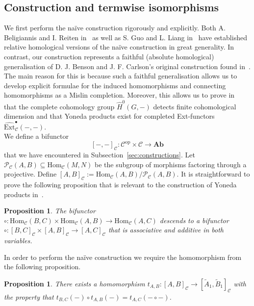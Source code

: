 \documentclass[12pt,a4paper]{article}
\numberwithin{equation}{section}
\newtheorem{prop}[thm]{Proposition}
\theoremstyle{nonumberplain}
\begin{document}
\subsection{Construction and termwise isomorphisms}

We first perform the naïve construction rigorously and explicitly. Both A.\! Beligiannis and I.\! Reiten in~\cite[p.~37--38/163--165]{bel07} as well as S.\! Guo and L.\! Liang in~\cite[p.~14--15]{guo23} have established relative homological versions of the naïve construction in great generality. In contrast, our construction represents a faithful (absolute homological) generalisation of D.\! J.\! Benson and J.\! F.\! Carlson's original construction found in~\cite[p.~109]{ben92}. The main reason for this is because such a faithful generalisation allows us to develop explicit formulae for the induced homomorphisms and connecting homomorphisms as a Mislin completion. Moreover, this allows us to prove in~\cite{ghe24} that the complete cohomology group $\widehat{H}^0(G, -)$ detects finite cohomological dimension and that Yoneda products exist for completed Ext-functors $\widehat{\mathrm{Ext}}_{\mathcal{C}}^{\bullet}(-, -)$. \\

We define a bifunctor
\[ [-, -]_{\mathcal{C}}: \mathcal{C}^{\mathrm{op}} \times \mathcal{C} \rightarrow \mathbf{Ab} \]
that we have encountered in Subsection~\ref{sec:constructions}. Let $\mathcal{P}_{\mathcal{C}}(A, B) \subseteq \mathrm{Hom}_{\mathcal{C}}(M, N)$ be the subgroup of morphisms factoring through a projective. Define $[A, B]_{\mathcal{C}} := \mathrm{Hom}_{\mathcal{C}}(A, B) / \mathcal{P}_{\mathcal{C}}(A, B)$. It is straightforward to prove the following proposition that is relevant to the construction of Yoneda products in~\cite[Theorem~6.6]{ghe24}.

\begin{prop}\label{prop:biadditive}
The bifunctor $\circ: \mathrm{Hom}_{\mathcal{C}}(B, C) \times \mathrm{Hom}_{\mathcal{C}}(A, B) \rightarrow \mathrm{Hom}_{\mathcal{C}}(A, C)$ descends to a bifunctor $\circ: [B, C]_{\mathcal{C}} \times [A, B]_{\mathcal{C}} \rightarrow [A, C]_{\mathcal{C}}$ that is associative and additive in both variables.
\end{prop}

In order to perform the naïve construction we require the homomorphism from the following proposition.

\begin{prop}\label{prop:transitioning}
There exists a homomorphism $t_{A, B}: [A, B]_{\mathcal{C}} \rightarrow [\widetilde{A}_1, \widetilde{B}_1]_{\mathcal{C}}$ with the property that $t_{B, C}(-) \circ t_{A, B}(-) = t_{A, C}(- \circ -)$.
\end{prop}
\end{document}
